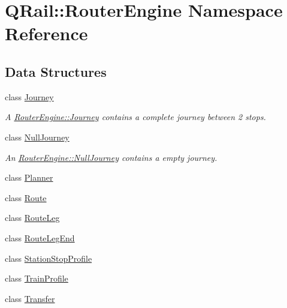 \hypertarget{namespaceQRail_1_1RouterEngine}{}\section{Q\+Rail\+::Router\+Engine Namespace Reference}
\label{namespaceQRail_1_1RouterEngine}
\subsection*{Data Structures}
\begin{DoxyCompactItemize}
\item 
class \mbox{\hyperlink{classQRail_1_1RouterEngine_1_1Journey}{Journey}}
\begin{DoxyCompactList}\small\item\em A \mbox{\hyperlink{classQRail_1_1RouterEngine_1_1Journey}{Router\+Engine\+::\+Journey}} contains a complete journey between 2 stops. \end{DoxyCompactList}\item 
class \mbox{\hyperlink{classQRail_1_1RouterEngine_1_1NullJourney}{Null\+Journey}}
\begin{DoxyCompactList}\small\item\em An \mbox{\hyperlink{classQRail_1_1RouterEngine_1_1NullJourney}{Router\+Engine\+::\+Null\+Journey}} contains a empty journey. \end{DoxyCompactList}\item 
class \mbox{\hyperlink{classQRail_1_1RouterEngine_1_1Planner}{Planner}}
\item 
class \mbox{\hyperlink{classQRail_1_1RouterEngine_1_1Route}{Route}}
\item 
class \mbox{\hyperlink{classQRail_1_1RouterEngine_1_1RouteLeg}{Route\+Leg}}
\item 
class \mbox{\hyperlink{classQRail_1_1RouterEngine_1_1RouteLegEnd}{Route\+Leg\+End}}
\item 
class \mbox{\hyperlink{classQRail_1_1RouterEngine_1_1StationStopProfile}{Station\+Stop\+Profile}}
\item 
class \mbox{\hyperlink{classQRail_1_1RouterEngine_1_1TrainProfile}{Train\+Profile}}
\item 
class \mbox{\hyperlink{classQRail_1_1RouterEngine_1_1Transfer}{Transfer}}
\end{DoxyCompactItemize}
